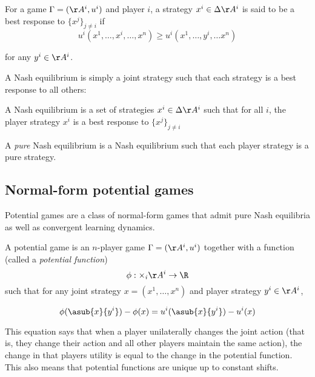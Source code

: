 \begin{mydef}
For a game $\Gamma = (\AA^i, u^i)$ and player $i$, a strategy $x^i \in \Delta \AA^i$ is said to be a best response to $\{x^j\}_{j \neq i}$ if
$$
u^i(x^1, \ldots, x^i, \ldots, x^n) \geq u^i(x^1, \ldots, y^i, \ldots x^n)
$$

for any $y^i \in \AA^i$.

\end{mydef}


A Nash equilibrium is simply a joint strategy such that each strategy is a best response to all others:

\begin{mydef}
A Nash equilibrium is a set of strategies $x^i \in \Delta \AA^i$ such that for all $i$, the player strategy $x^i$ is a best response to $\{x^j\}_{j \neq i}$
\end{mydef}

A {\em pure} Nash equilibrium is a Nash equilibrium such that each player strategy is a pure strategy.

\subsection{Normal-form potential games}

Potential games are a class of normal-form games that admit pure Nash equilibria as well as convergent learning dynamics.

\begin{mydef}
A potential game is an $n$-player game $\Gamma = (\AA^i, u^i)$ together with a function (called a {\em potential function}) 
$$
\phi: \times_i \AA^i \rightarrow \R
$$
 such that for any joint strategy $x = (x^1, \ldots, x^n)$ and player strategy $y^i \in \AA^i$,

$$
\phi(\asub{x}{y^i}) - \phi(x) = u^i(\asub{x}{y^i}) - u^i(x)
$$
\end{mydef}


This equation says that when a player unilaterally changes the joint action (that is, they change their action and all other players maintain the same action), the change in that players utility is equal to the change in the potential function. This also means that potential functions are unique up to constant shifts.


